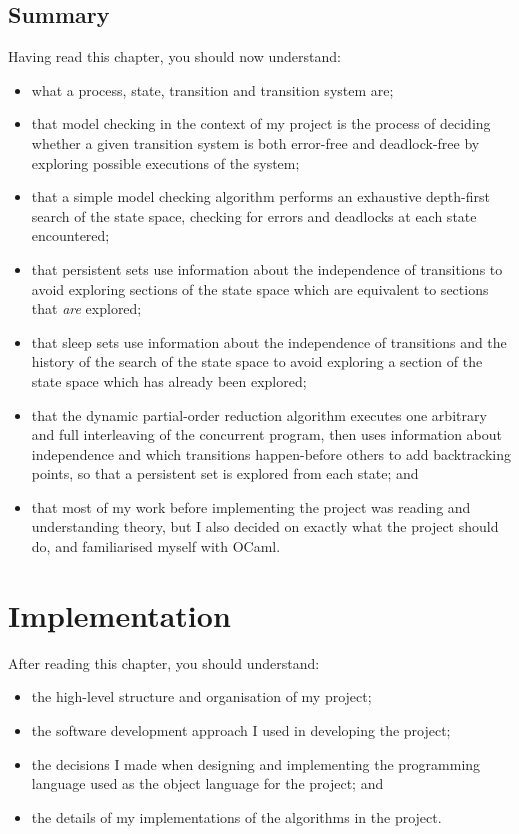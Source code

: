\documentclass[12pt,a4paper,twoside,openright]{report}
\newenvironment{understandinglist}
	{\begin{itemize} \itemsep 0em}{\end{itemize}}
\begin{document}
\section{Summary}
Having read this chapter,
you should now understand:
\begin{understandinglist}
	\item what a process, state, transition
	and transition system are;
	\item that model checking in the
	context of my project is the process
	of deciding whether a given transition
	system is both error-free and deadlock-free
	by exploring possible executions of the
	system;
	\item that a simple model checking algorithm
	performs an exhaustive depth-first search
	of the state space, checking for errors and
	deadlocks at each state encountered;
	\item that persistent sets use information
	about the independence of transitions to
	avoid exploring sections of the state space
	which are equivalent to sections that \emph{are}
	explored;
	\item that sleep sets use information about
	the independence of transitions and the history
	of the search of the state space to avoid
	exploring a section of the state space which
	has already been explored;
	\item that the dynamic partial-order
	reduction algorithm executes one arbitrary
	and full interleaving of the concurrent program,
	then uses information about independence and
	which transitions happen-before others to
	add backtracking points, so that a
	persistent set is explored from each state; and
	\item that most of my work before implementing
	the project was reading and understanding theory,
	but I also decided on exactly what the project
	should do, and familiarised myself with OCaml.
\end{understandinglist}

\chapter{Implementation}
\label{cha:imp}
After reading this chapter,
you should understand:
\begin{understandinglist}
	\item the high-level structure and
	organisation of my project;
	\item the software development approach
	I used in developing the project;
	\item the decisions I made
	when designing and implementing
	the programming language used
	as the object language for the
	project; and
	\item the details of my
	implementations of the
	algorithms in the project.
\end{understandinglist}
\end{document}
